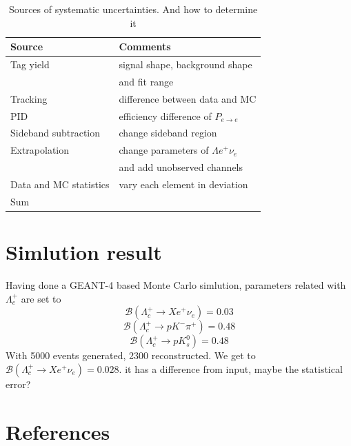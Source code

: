 \documentclass{beamer}
\begin{document}
\begin{frame}
    \begin{table}
        \centering
        \caption{ {Sources of systematic uncertainties. And how to determine it}}
        \begin{tabular}{ll}
          \hline \hline
          Source&         Comments\\
          \hline
          Tag yield&         signal shape, background shape \\
          &and fit range\\
          Tracking&         difference between data and MC\\
          PID&         efficiency difference of $P_{e\rightarrow e}$ \\
          Sideband subtraction&        change sideband region\\
          Extrapolation&         change parameters of $\Lambda e^+ \nu_e$  \\
          & and add unobserved channels\\
          Data and MC statistics&         vary each element in deviation\\
          \hline
          Sum&                             \\
          \hline \hline
        \end{tabular}
      
        \label {table: summary of systematic uncertainties}
      \end{table} 
\end{frame}

\section{Simlution result}
\begin{frame}
    Having done a GEANT-4 based Monte Carlo simlution, parameters related with $\Lambda_c^+$ are set to 
    $$\mathcal{B}(\Lambda_c^+ \rightarrow X e^+ \nu_e) = 0.03$$
    $$\mathcal{B}(\Lambda_c^+ \rightarrow pK^-\pi^+) = 0.48$$
    $$\mathcal{B}(\Lambda_c^+ \rightarrow pK^0_s) = 0.48$$
    With 5000 events generated, 2300 reconstructed. We get to $\mathcal{B}(\Lambda_c^+ \rightarrow X e^+ \nu_e) = 0.028$. it has a difference from input, maybe the statistical error?
\end{frame}

\section{References}
\begin{frame}[allowframebreaks]
    
\end{frame}
\end{document}
